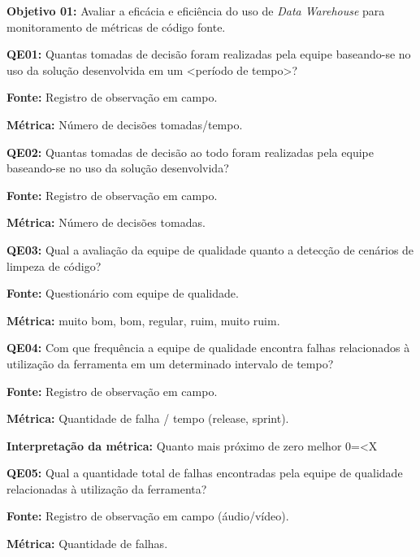 \textbf{Objetivo 01:} Avaliar a eficácia e eficiência do uso de \textit{Data Warehouse} para monitoramento de métricas de código fonte. \newline


\textbf{QE01:} Quantas tomadas de decisão foram realizadas pela equipe baseando-se no uso da solução desenvolvida em um <período de tempo>?

\textbf{Fonte:} Registro de observação em campo.

\textbf{Métrica:} Número de decisões tomadas/tempo. \newline


\textbf{QE02: } Quantas tomadas de decisão ao todo foram realizadas pela equipe baseando-se no uso da solução desenvolvida?

\textbf{Fonte:} Registro de observação em campo.

\textbf{Métrica:} Número de decisões tomadas. \newline



\textbf{QE03: } Qual a avaliação da equipe de qualidade quanto a detecção de cenários de limpeza de código?

\textbf{Fonte:} Questionário com equipe de qualidade.

\textbf{Métrica:} muito bom, bom, regular, ruim, muito ruim. \newline


\textbf{QE04: } Com que frequência a equipe de qualidade encontra falhas relacionados à utilização da ferramenta em um determinado intervalo de tempo?

\textbf{Fonte:} Registro de observação em campo.

\textbf{Métrica:} Quantidade de falha / tempo (release, sprint).

\textbf{Interpretação da métrica:} Quanto mais próximo de zero melhor 0=<X \newline


\textbf{QE05: } Qual a quantidade total de falhas encontradas pela equipe de qualidade relacionadas à utilização da ferramenta?

\textbf{Fonte:} Registro de observação em campo (áudio/vídeo).

\textbf{Métrica:} Quantidade de falhas. \newline

